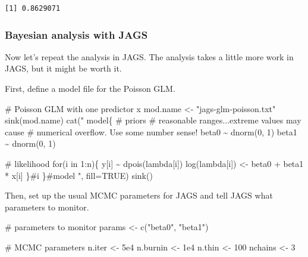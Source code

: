 \documentclass[
  13,
  letterpaper,
]{report}
\newenvironment{Shaded}{\begin{snugshade}}{\end{snugshade}}
\newcommand{\AttributeTok}[1]{\textcolor[rgb]{0.40,0.45,0.13}{#1}}
\newcommand{\CommentTok}[1]{\textcolor[rgb]{0.37,0.37,0.37}{#1}}
\newcommand{\ConstantTok}[1]{\textcolor[rgb]{0.56,0.35,0.01}{#1}}
\newcommand{\DecValTok}[1]{\textcolor[rgb]{0.68,0.00,0.00}{#1}}
\newcommand{\FloatTok}[1]{\textcolor[rgb]{0.68,0.00,0.00}{#1}}
\newcommand{\FunctionTok}[1]{\textcolor[rgb]{0.28,0.35,0.67}{#1}}
\newcommand{\NormalTok}[1]{\textcolor[rgb]{0.00,0.23,0.31}{#1}}
\newcommand{\OtherTok}[1]{\textcolor[rgb]{0.00,0.23,0.31}{#1}}
\newcommand{\StringTok}[1]{\textcolor[rgb]{0.13,0.47,0.30}{#1}}
\begin{document}
\begin{verbatim}
[1] 0.8629071
\end{verbatim}

\subsubsection{Bayesian analysis with JAGS}\label{sec-glm1-pois-ex-jags}

Now let's repeat the analysis in JAGS. The analysis takes a little more
work in JAGS, but it might be worth it.

First, define a model file for the Poisson GLM.

\begin{Shaded}
\begin{Highlighting}[]
\CommentTok{\# Poisson GLM with one predictor x}
\NormalTok{mod.name }\OtherTok{\textless{}{-}} \StringTok{"jags{-}glm{-}poisson.txt"}
\FunctionTok{sink}\NormalTok{(mod.name)}
\FunctionTok{cat}\NormalTok{(}\StringTok{"}
\StringTok{    model\{}
\StringTok{        \# priors}
\StringTok{        \# reasonable ranges...extreme values may cause}
\StringTok{        \# numerical overflow. Use some number sense!}
\StringTok{        beta0 \textasciitilde{} dnorm(0, 1)}
\StringTok{        beta1 \textasciitilde{} dnorm(0, 1)}

\StringTok{        \# likelihood}
\StringTok{        for(i in 1:n)\{}
\StringTok{            y[i] \textasciitilde{} dpois(lambda[i])}
\StringTok{            log(lambda[i]) \textless{}{-} beta0 + beta1 * x[i]}
\StringTok{        \}\#i}
\StringTok{    \}\#model}
\StringTok{"}\NormalTok{, }\AttributeTok{fill=}\ConstantTok{TRUE}\NormalTok{)}
\FunctionTok{sink}\NormalTok{()}
\end{Highlighting}
\end{Shaded}

Then, set up the usual MCMC parameters for JAGS and tell JAGS what
parameters to monitor.

\begin{Shaded}
\begin{Highlighting}[]
\CommentTok{\# parameters to monitor}
\NormalTok{params }\OtherTok{\textless{}{-}} \FunctionTok{c}\NormalTok{(}\StringTok{"beta0"}\NormalTok{, }\StringTok{"beta1"}\NormalTok{)}

\CommentTok{\# MCMC parameters}
\NormalTok{n.iter }\OtherTok{\textless{}{-}} \FloatTok{5e4}
\NormalTok{n.burnin }\OtherTok{\textless{}{-}} \FloatTok{1e4}
\NormalTok{n.thin }\OtherTok{\textless{}{-}} \DecValTok{100}
\NormalTok{nchains }\OtherTok{\textless{}{-}} \DecValTok{3}
\end{Highlighting}
\end{Shaded}
\end{document}
